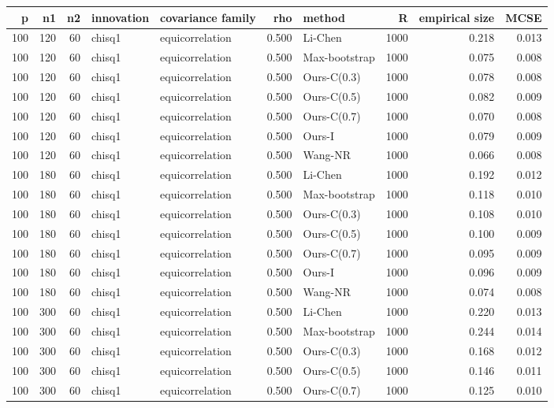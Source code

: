 \begin{tabular}{rrrllrlrrr}
\toprule
p & n1 & n2 & innovation & covariance family & rho & method & R & empirical size & MCSE \\
\midrule
100 & 120 & 60 & chisq1 & equicorrelation & 0.500 & Li-Chen & 1000 & 0.218 & 0.013 \\
100 & 120 & 60 & chisq1 & equicorrelation & 0.500 & Max-bootstrap & 1000 & 0.075 & 0.008 \\
100 & 120 & 60 & chisq1 & equicorrelation & 0.500 & Ours-C(0.3) & 1000 & 0.078 & 0.008 \\
100 & 120 & 60 & chisq1 & equicorrelation & 0.500 & Ours-C(0.5) & 1000 & 0.082 & 0.009 \\
100 & 120 & 60 & chisq1 & equicorrelation & 0.500 & Ours-C(0.7) & 1000 & 0.070 & 0.008 \\
100 & 120 & 60 & chisq1 & equicorrelation & 0.500 & Ours-I & 1000 & 0.079 & 0.009 \\
100 & 120 & 60 & chisq1 & equicorrelation & 0.500 & Wang-NR & 1000 & 0.066 & 0.008 \\
100 & 180 & 60 & chisq1 & equicorrelation & 0.500 & Li-Chen & 1000 & 0.192 & 0.012 \\
100 & 180 & 60 & chisq1 & equicorrelation & 0.500 & Max-bootstrap & 1000 & 0.118 & 0.010 \\
100 & 180 & 60 & chisq1 & equicorrelation & 0.500 & Ours-C(0.3) & 1000 & 0.108 & 0.010 \\
100 & 180 & 60 & chisq1 & equicorrelation & 0.500 & Ours-C(0.5) & 1000 & 0.100 & 0.009 \\
100 & 180 & 60 & chisq1 & equicorrelation & 0.500 & Ours-C(0.7) & 1000 & 0.095 & 0.009 \\
100 & 180 & 60 & chisq1 & equicorrelation & 0.500 & Ours-I & 1000 & 0.096 & 0.009 \\
100 & 180 & 60 & chisq1 & equicorrelation & 0.500 & Wang-NR & 1000 & 0.074 & 0.008 \\
100 & 300 & 60 & chisq1 & equicorrelation & 0.500 & Li-Chen & 1000 & 0.220 & 0.013 \\
100 & 300 & 60 & chisq1 & equicorrelation & 0.500 & Max-bootstrap & 1000 & 0.244 & 0.014 \\
100 & 300 & 60 & chisq1 & equicorrelation & 0.500 & Ours-C(0.3) & 1000 & 0.168 & 0.012 \\
100 & 300 & 60 & chisq1 & equicorrelation & 0.500 & Ours-C(0.5) & 1000 & 0.146 & 0.011 \\
100 & 300 & 60 & chisq1 & equicorrelation & 0.500 & Ours-C(0.7) & 1000 & 0.125 & 0.010 \\

\end{tabular}
